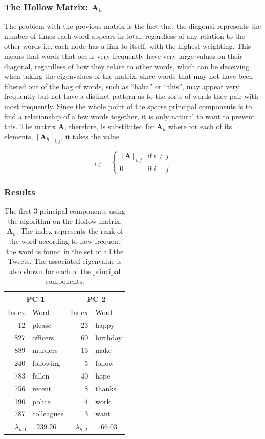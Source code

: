 \documentclass[11pt,a4paper]{article}
\begin{document}
  
\subsubsection{The Hollow Matrix: $\mathbf{A}_{h}$}

The problem with the previous matrix is the fact that the diagonal represents the number of times each word appears in total, regardless of any relation to the other words i.e. each node has a link to itself, with the highest weighting. This means that words that occur very frequently have very large values on their diagonal, regardless of how they relate to other words, which can be deceiving when taking the eigenvalues of the matrix, since words that may not have been filtered out of the bag of words, such as ``haha'' or ``this'', may appear very frequently but not have a distinct pattern as to the sorts of words they pair with most frequently. Since the whole point of the sparse principal components is to find a relationship of a few words together, it is only natural to want to prevent this. The matrix $\mathbf{A}$, therefore,  is substituted for 
$\mathbf{A}_h$ where for each of its elements, $[\mathbf{A}_h]_{i, j}$, it takes the value 

\begin{equation}
[\mathbf{A}_h]_{i, j}= 
\begin{cases}
[\mathbf{A}]_{i, j} & \text{if}\ i \neq j\\
0 & \text{if}\ i = j
\end{cases}
\end{equation}

\subsubsection*{Results}
\begin{table}[H]
\center
\begin{tabular}{| r| l | r| l |}
\hline
\multicolumn{2}{|c|}{PC 1} & \multicolumn{2}{|c|}{PC 2}\\
\hline
Index & Word & Index & Word\\
\hline
12 & please & 23 & happy \\
827 & officers & 60 & birthday \\
889 & murders & 13 & make \\
240 & following & 5 & follow\\
783 & fallen & 40 & hope\\
756 & recent & 8 & thanks\\ 
190 & police & 4 & work\\
787 & colleagues & 3 & want\\
\hline
\multicolumn{2}{|c|}{ $\lambda_{h, 1} = 239.26$}  & \multicolumn{2}{|c|}{ $\lambda_{h, 2} = 166.03$}  \\
\hline
\end{tabular}
\caption{The first 3 principal components using the algorithm on the Hollow matrix, $ \mathbf{A}_h$. The index represents the rank of the word according to how frequent the word is found in the set of all the Tweets. The associated eigenvalue is also shown for each of the principal components.}
\end{table}
\end{document}
